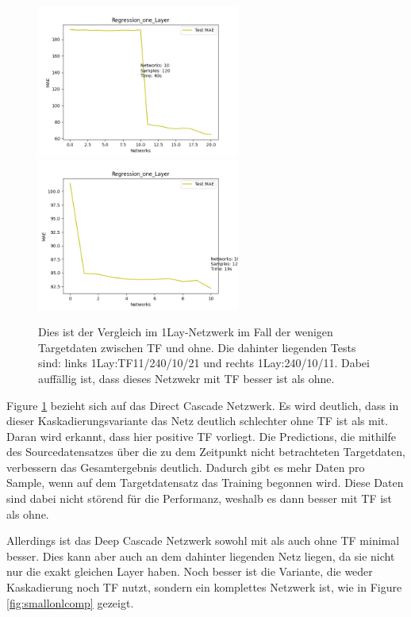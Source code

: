 \begin{figure}[htpb]
    \includegraphics[height=5cm]{../../Plots/ba_plots/regression_small/onelayer_ts.png}
    \includegraphics[height=5cm]{../../Plots/ba_plots/regression_small/woonelayer_ts.png}
    \caption{\label{fig:smallonl} 
    \small{Dies ist der Vergleich im 1Lay-Netzwerk im Fall der wenigen Targetdaten zwischen TF und ohne. Die dahinter liegenden Tests sind: 
    links 1Lay:TF11/240/10/21 und rechts 1Lay:240/10/11. Dabei auffällig ist, dass dieses Netzwekr mit TF besser ist als ohne.}}
\end{figure}

Figure \ref{fig:smallonl} bezieht sich auf das Direct Cascade Netzwerk. Es wird deutlich, dass in dieser Kaskadierungsvariante das Netz deutlich schlechter 
ohne TF ist als mit. Daran wird erkannt, dass hier positive TF vorliegt. Die Predictions, die mithilfe des Sourcedatensatzes über die 
zu dem Zeitpunkt nicht betrachteten Targetdaten, verbessern das Gesamtergebnis deutlich. Dadurch gibt es mehr Daten pro Sample, wenn auf dem 
Targetdatensatz das Training begonnen wird. Diese Daten sind dabei nicht störend für die Performanz, weshalb es dann besser mit TF ist als ohne. 

Allerdings ist das Deep Cascade Netzwerk sowohl mit als auch ohne TF minimal besser. Dies kann aber auch 
an dem dahinter liegenden Netz liegen, da sie nicht nur die exakt gleichen Layer haben. 
Noch besser ist die Variante, 
die weder Kaskadierung noch TF nutzt, sondern ein komplettes Netzwerk ist, wie in Figure \ref{fig:smallonlcomp} gezeigt. 

